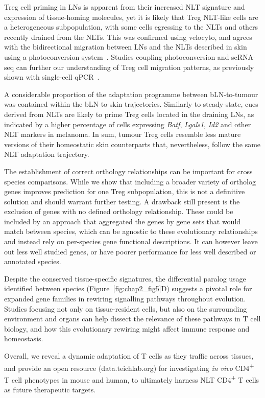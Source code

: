 Treg cell priming in LNs is apparent from their increased NLT signature and expression of tissue-homing molecules, yet it is likely that Treg NLT-like cells are a heterogeneous subpopulation, with some cells egressing to the NLTs and others recently drained from the NLTs. This was confirmed using velocyto, and agrees with the bidirectional migration between LNs and the NLTs described in skin using a photoconversion system~\citep{Matsushima2010-ph}. Studies coupling photoconversion and scRNA-seq can further our understanding of Treg cell migration patterns, as previously shown with single-cell qPCR~\citep{Ikebuchi2016-hb}.

A considerable proportion of the adaptation programme between bLN-to-tumour was contained within the bLN-to-skin trajectories. Similarly to steady-state, cues derived from NLTs are likely to prime Treg cells located in the draining LNs, as indicated by a higher percentage of cells expressing \textit{Batf}, \textit{Lgals1}, \textit{Id2} and other NLT markers in melanoma. In sum, tumour Treg cells resemble less mature versions of their homeostatic skin counterparts that, nevertheless, follow the same NLT adaptation trajectory.

The establishment of correct orthology relationships can be important for cross species comparisons. While we show that including a broader variety of ortholog genes improves prediction for one Treg subpopulation, this is not a definitive solution and should warrant further testing. A drawback still present is the exclusion of genes with no defined orthology relationship. These could be included by an approach that aggregated the genes by gene sets that would match between species, which can be agnostic to these evolutionary relationships and instead rely on per-species gene functional descriptions. It can however leave out less well studied genes, or have poorer performance for less well described or annotated species.

Despite the conserved tissue-specific signatures, the differential paralog usage identified between species (Figure~\ref{fig:chap2_fig5}D) suggests a pivotal role for expanded gene families in rewiring signalling pathways throughout evolution. Studies focusing not only on tissue-resident cells, but also on the surrounding environment and organs can help dissect the relevance of these pathways in T cell biology, and how this evolutionary rewiring might affect immune response and homeostasis.

Overall, we reveal a dynamic adaptation of T cells as they traffic across tissues, and provide an open resource (data.teichlab.org) for investigating \textit{in vivo} CD4\textsuperscript{+} T cell phenotypes in mouse and human, to ultimately harness NLT CD4\textsuperscript{+} T cells as future therapeutic targets.



